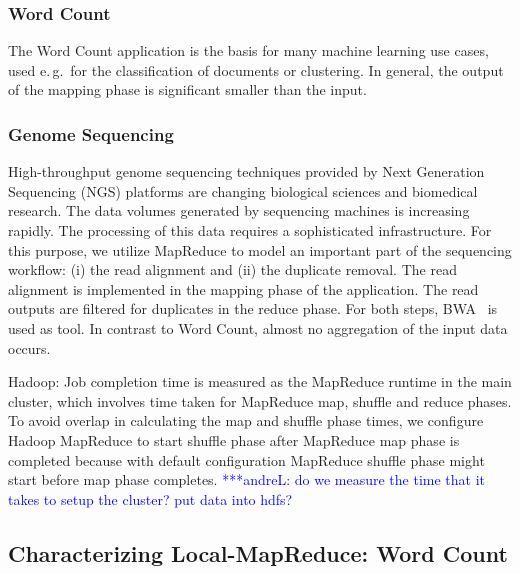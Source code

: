 \documentclass{acm_proc_article-sp}
\newcommand{\alnote}[1]{ {\textcolor{blue} { ***andreL: #1 }}}
\newcommand{\alnote}[1]{}
\begin{document}
\subsubsection*{Word Count}

The Word Count application is the basis for many machine learning use cases, 
used e.\,g.\ for the classification of documents or clustering. In general, 
the output of the mapping phase is significant smaller than the input.


\subsubsection*{Genome Sequencing}

High-throughput genome sequencing techniques provided by Next Generation
Sequencing (NGS) platforms are changing biological sciences and biomedical
research. The data volumes generated by sequencing machines is 
increasing rapidly. The processing of this data requires a sophisticated 
infrastructure. For this purpose, we utilize MapReduce to model an important 
part of the sequencing workflow: (i) the read alignment and (ii) the 
duplicate removal. The read alignment is implemented in the mapping phase of 
the application. The read outputs are filtered for duplicates in the reduce 
phase. For both steps, BWA~\cite{Li:2010:FAL:1741823.1741825} is used as tool. 
In contrast to Word Count, almost no aggregation of the input data occurs.

Hadoop: Job completion time is measured as the MapReduce runtime in the main
cluster, which involves time taken for MapReduce map, shuffle and reduce
phases. To avoid overlap in calculating the map and shuffle phase times, we
configure Hadoop MapReduce to start shuffle phase after MapReduce map phase is
completed because with default configuration MapReduce shuffle phase might
start before map phase completes.\alnote{do we measure the time that it takes 
to setup the cluster? put data into hdfs?}


\subsection{Characterizing Local-MapReduce: Word Count}
\end{document}
